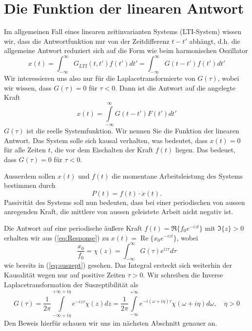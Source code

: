 \section{Die Funktion der linearen Antwort}
Im allgemeinen Fall eines linearen zeitinvarianten Systems (LTI-System) wissen
wir, dass die Antwortfunktion nur von der Zeitdifferenz $t-t'$ abhängt, d.h.
die allgemeine Antwort reduziert sich auf die Form wie beim harmonischen
Oszillator
\begin{equation}
  x(t)=\int_{-\infty}^{\infty}G_{LTI}(t,t')f(t')dt'=\int_{-\infty}^{\infty}G(t-t')f(t')dt'
  \label{eq:soluLTI}
\end{equation} 
Wir interessieren uns also nur für die Laplacetransformierte von $G(\tau)$,
wobei wir wissen, dass $G(\tau)=0$ für $\tau<0$. Dann ist die Antwort auf die
angelegte Kraft 
\begin{equation}
  x(t)=\int\limits_{-\infty}^{\infty}G(t-t')F(t')dt'
  \label{eq:Response}
\end{equation} 
$G(\tau)$ ist die reelle Systemfunktion. Wir nennen Sie die Funktion der
linearen Antwort. Das System solle sich kausal verhalten, was bedeutet, dass
$x(t)=0$ für alle Zeiten $t$, die vor dem Eischalten der Kraft $f(t)$ liegen.
Das bedeuet, dass $G(\tau)=0$ für $\tau<0$.

Ausserdem sollen $x(t)$ und $f(t)$ die momentane Arbeitsleistung des Systems
bestimmen durch 
\[P(t)=f(t)\cdot\dot{x}(t).\]
Passivität des Systems soll nun bedeuten, dass bei einer periodischen von
aussen anregenden Kraft, die mittlere von aussen geleistete Arbeit nicht
negativ ist.

Die Antwort auf eine periodische äußere Kraft
$f(t)=\Re\{f_0e^{-izt}\}$ mit $\Im\{z\}>0$ erhalten
wir aus (\ref{eq:Response}) zu $x(t)=\operatorname{Re}\{x_0e^{-izt}\}$, wobei
\[
  \frac{x_0}{f_0} = \chi(z) = \int_{-\infty}^\infty G(\tau)e^{iz\tau}d\tau 
\]
wie bereits in (\ref{eq:suszept}) gesehen. Das Integral ersteckt sich
weiterhin der Kausalität wegen nur auf positive Zeiten $\tau>0$. Wir schreiben
die Inverse Laplacetransformation der Suszeptibilität als
\begin{equation}
  G(\tau)=\frac{1}{2\pi}\int\limits_{-\infty+i\eta}^{+\infty+i\eta}e^{-iz\tau}\chi(z)dz=
  \frac{1}{2\pi}\int\limits_{-\infty}^{+\infty}e^{-i(\omega+i\eta)\tau}\chi(\omega+i\eta)d\omega,
  \quad \eta>0
  \label{eq:LinRespRueck}
\end{equation}
Den Beweis hierfür schauen wir uns im nächsten Abschnitt genauer an.

